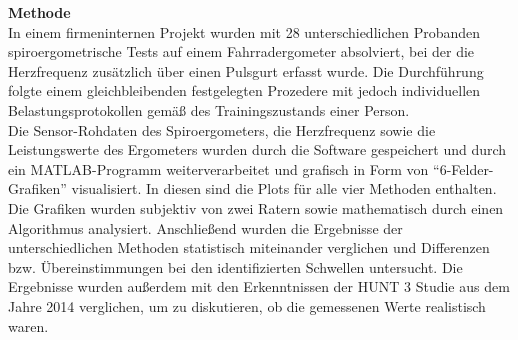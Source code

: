 \textbf{\Large Methode}\\

In einem firmeninternen Projekt wurden mit 28 unterschiedlichen Probanden spiroergometrische Tests auf einem Fahrradergometer absolviert, bei der die Herzfrequenz zusätzlich über einen Pulsgurt erfasst wurde. Die Durchführung folgte einem gleichbleibenden festgelegten Prozedere mit jedoch individuellen Belastungsprotokollen gemäß des Trainingszustands einer Person.\\
Die Sensor-Rohdaten des Spiroergometers, die Herzfrequenz sowie die Leistungswerte des Ergometers wurden durch die Software gespeichert und durch ein MATLAB-Programm weiterverarbeitet und grafisch in Form von "`6-Felder-Grafiken"' visualisiert. In diesen sind die Plots für alle vier Methoden enthalten. Die Grafiken wurden subjektiv von zwei Ratern sowie mathematisch durch einen Algorithmus analysiert. Anschließend wurden die Ergebnisse der unterschiedlichen Methoden statistisch miteinander verglichen und Differenzen bzw. Übereinstimmungen bei den identifizierten Schwellen untersucht. Die Ergebnisse wurden außerdem mit den Erkenntnissen der HUNT 3 Studie aus dem Jahre 2014 verglichen, um zu diskutieren, ob die gemessenen Werte realistisch waren.